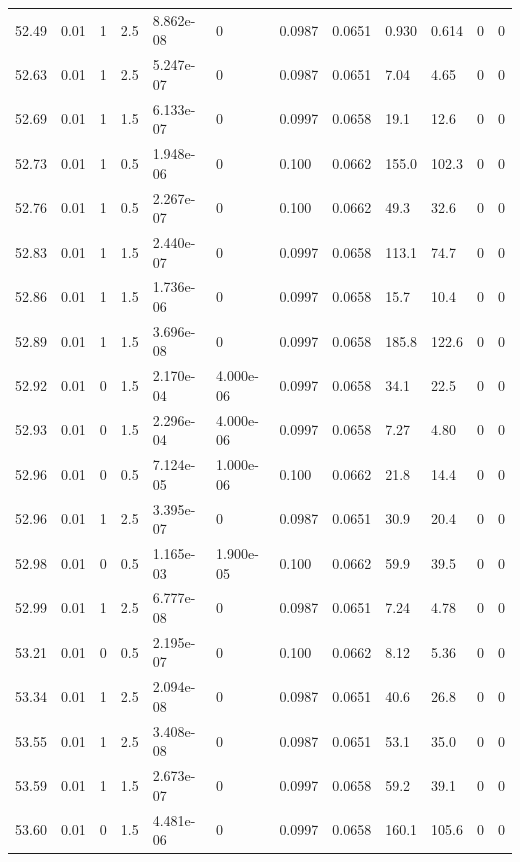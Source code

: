 \documentclass[preview]{standalone}
\begin{document}
{{{{{{{{{{{{\begin{tabular}{L{1.2cm}C{1.2cm} C{0.3cm}C{0.5cm} C{1.4cm}C{1.4cm} C{1.4cm}C{1.4cm} C{1.6cm}C{1.6cm} C{1.6cm}C{1.6cm}}
  52.49  &  0.01  & 1     & 2.5 &  8.862e-08  & 0  &  0.0987&   0.0651& 0.930 & 0.614   &  0 & 0  \\ 
  52.63  &  0.01  & 1     & 2.5 &  5.247e-07  & 0  &  0.0987&   0.0651& 7.04 & 4.65   &  0 & 0  \\ 
  52.69  &  0.01  & 1     & 1.5 &  6.133e-07  & 0  &  0.0997&   0.0658& 19.1 & 12.6   &  0 & 0  \\ 
  52.73  &  0.01  & 1     & 0.5 &  1.948e-06  & 0  &  0.100&   0.0662& 155.0 & 102.3   &  0 & 0  \\ 
  52.76  &  0.01  & 1     & 0.5 &  2.267e-07  & 0  &  0.100&   0.0662& 49.3 & 32.6   &  0 & 0  \\ 
  52.83  &  0.01  & 1     & 1.5 &  2.440e-07  & 0  &  0.0997&   0.0658& 113.1 & 74.7   &  0 & 0  \\ 
  52.86  &  0.01  & 1     & 1.5 &  1.736e-06  & 0  &  0.0997&   0.0658& 15.7 & 10.4   &  0 & 0  \\ 
  52.89  &  0.01  & 1     & 1.5 &  3.696e-08  & 0  &  0.0997&   0.0658& 185.8 & 122.6   &  0 & 0  \\ 
  52.92  &  0.01  & 0     & 1.5 &  2.170e-04  & 4.000e-06  &  0.0997&   0.0658& 34.1 & 22.5   &  0 & 0  \\ 
  52.93  &  0.01  & 0     & 1.5 &  2.296e-04  & 4.000e-06  &  0.0997&   0.0658& 7.27 & 4.80   &  0 & 0  \\ 
  52.96  &  0.01  & 0     & 0.5 &  7.124e-05  & 1.000e-06  &  0.100&   0.0662& 21.8 & 14.4   &  0 & 0  \\ 
  52.96  &  0.01  & 1     & 2.5 &  3.395e-07  & 0  &  0.0987&   0.0651& 30.9 & 20.4   &  0 & 0  \\ 
  52.98  &  0.01  & 0     & 0.5 &  1.165e-03  & 1.900e-05  &  0.100&   0.0662& 59.9 & 39.5   &  0 & 0  \\ 
  52.99  &  0.01  & 1     & 2.5 &  6.777e-08  & 0  &  0.0987&   0.0651& 7.24 & 4.78   &  0 & 0  \\ 
  53.21  &  0.01  & 0     & 0.5 &  2.195e-07  & 0  &  0.100&   0.0662& 8.12 & 5.36   &  0 & 0  \\ 
  53.34  &  0.01  & 1     & 2.5 &  2.094e-08  & 0  &  0.0987&   0.0651& 40.6 & 26.8   &  0 & 0  \\ 
  53.55  &  0.01  & 1     & 2.5 &  3.408e-08  & 0  &  0.0987&   0.0651& 53.1 & 35.0   &  0 & 0  \\ 
  53.59  &  0.01  & 1     & 1.5 &  2.673e-07  & 0  &  0.0997&   0.0658& 59.2 & 39.1   &  0 & 0  \\ 
  53.60  &  0.01  & 0     & 1.5 &  4.481e-06  & 0  &  0.0997&   0.0658& 160.1 & 105.6   &  0 & 0  \\ 

\end{tabular}}}}}}}}}}}}}
\end{document}
